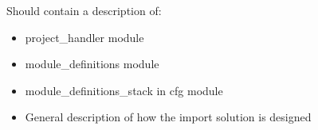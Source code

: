 Should contain a description of:
\begin{itemize}
\item project\_handler module
\item module\_definitions module
\item module\_definitions\_stack in cfg module
\item General description of how the import solution is designed
\end{itemize}
